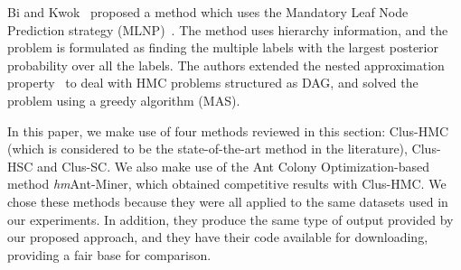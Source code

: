 Bi and Kwok~\cite{Bi2014} proposed a method which uses the Mandatory Leaf Node Prediction strategy (MLNP)~\cite{Silla2010}. The method uses hierarchy information, and the problem is formulated as finding the multiple labels with the largest posterior probability over all the labels. The authors extended the nested approximation property~\cite{Baraniuk2010} to deal with HMC problems structured as DAG, and solved the problem using a greedy algorithm (MAS).

In this paper, we make use of four methods reviewed in this section: Clus-HMC (which is considered to be the state-of-the-art method in the literature), Clus-HSC and Clus-SC. We also make use of the Ant Colony Optimization-based method {\it hm}Ant-Miner, which obtained competitive results with Clus-HMC. We chose these methods because they were all applied to the same datasets used in our experiments. In addition, they produce the same type of output provided by our proposed approach, and they have their code available for downloading, providing a fair base for comparison.